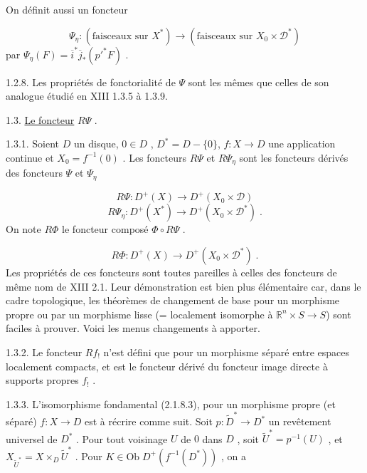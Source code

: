 On définit aussi un foncteur

\begin{equation*}
\Psi_\eta : (\mbox{faisceaux sur } X^* ) \longrightarrow (\mbox{faisceaux sur } X_0 \times \mathcal{D}^*)
\end{equation*}
par $\Psi_\eta(F) = \overline{i}^* \overline{j}_*({p'}^* F)$ .

1.2.8. Les propriétés de fonctorialité de $\Psi$ sont les mêmes que celles de son analogue étudié en XIII 1.3.5 à 1.3.9.




1.3. \underline{Le foncteur} $R\Psi$ .

1.3.1. Soient $D$ un disque, $0 \in D$ , $D^* = D-\{0\}$, $f: X \to D$ une application continue et $X_0 = f^{-1}(0)$ . Les foncteurs $R\Psi$ et $R\Psi_\eta$ sont les foncteurs dérivés des foncteurs $\Psi$ et $\Psi_\eta$

\begin{equation*}
R\Psi : D^+(X) \longrightarrow D^+(X_0 \times \mathcal{D})
\end{equation*}
\begin{equation*}
R\Psi_\eta : D^+(X^*) \longrightarrow D^+(X_0 \times \mathcal{D}^*) \; .
\end{equation*}
On note $R\Phi$ le foncteur composé $\Phi \circ R\Psi$ .

\begin{equation*}
R\Phi : D^+(X) \longrightarrow D^+(X_0 \times \mathcal{D}^*) \; .
\end{equation*}
Les propriétés de ces foncteurs sont toutes pareilles à celles des foncteurs de même nom de XIII 2.1. Leur démonstration est bien plus élémentaire car, dans le cadre topologique, les théorèmes de changement de base pour un morphisme propre ou par un morphisme lisse (= localement isomorphe à $\mathbb{R}^n \times S \to S$) sont faciles à prouver. Voici les menus changements à apporter.

1.3.2. Le foncteur $Rf_!$ n'est défini que pour un morphisme séparé entre espaces localement compacts, et est le foncteur dérivé du foncteur image directe à supports propres $f_!$ .

1.3.3. L'isomorphisme fondamental (2.1.8.3), pour un morphisme propre (et séparé) $f : X \to D$ est à récrire comme suit. Soit $p : \widetilde{D}^* \to D^*$ un revêtement universel de $D^*$ . Pour tout voisinage $U$ de $0$ dans $D$ , soit $\widetilde{U}^* = p^{-1}(U)$ , et $X_{\widetilde{U}^*} = X \times_D \widetilde{U}^*$ . Pour $K \in \mathrm{Ob}\; D^+(f^{-1}(D^*))$ , on a

